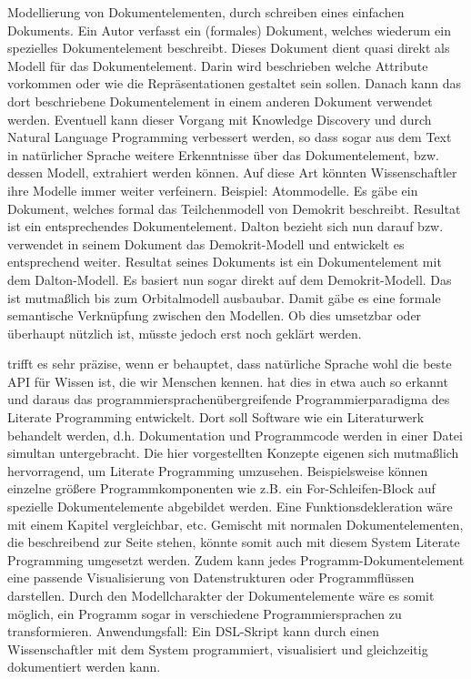  
Modellierung von Dokumentelementen, durch schreiben eines einfachen Dokuments. Ein Autor verfasst ein (formales) Dokument, welches wiederum ein spezielles Dokumentelement beschreibt. Dieses Dokument dient quasi direkt als Modell für das Dokumentelement. Darin wird beschrieben welche Attribute vorkommen oder wie die Repräsentationen gestaltet sein sollen. Danach kann das dort beschriebene Dokumentelement in einem anderen Dokument verwendet werden. Eventuell kann dieser Vorgang mit Knowledge Discovery und durch Natural Language Programming verbessert werden, so dass sogar aus dem Text in natürlicher Sprache weitere Erkenntnisse über das Dokumentelement, bzw. dessen Modell, extrahiert werden können. Auf diese Art könnten Wissenschaftler ihre Modelle immer weiter verfeinern. Beispiel: Atommodelle. Es gäbe ein Dokument, welches formal das Teilchenmodell von Demokrit beschreibt. Resultat ist ein entsprechendes Dokumentelement. Dalton bezieht sich nun darauf bzw. verwendet in seinem Dokument das Demokrit-Modell und entwickelt es entsprechend weiter. Resultat seines Dokuments ist ein Dokumentelement mit dem Dalton-Modell. Es basiert nun sogar direkt auf dem Demokrit-Modell. Das ist mutmaßlich bis zum Orbitalmodell ausbaubar. Damit gäbe es eine formale semantische Verknüpfung zwischen den Modellen. Ob dies umsetzbar oder überhaupt nützlich ist, müsste jedoch erst noch geklärt werden.

 
\citep[S.~3]{Segaran} trifft es sehr präzise, wenn er behauptet, dass natürliche Sprache wohl die beste API für Wissen ist, die wir Menschen kennen. \citep[S.~1]{Knuth} hat dies in etwa auch so erkannt und daraus das programmiersprachenübergreifende Programmierparadigma des Literate Programming entwickelt. Dort soll Software wie ein Literaturwerk behandelt werden, d.h. Dokumentation und Programmcode werden in einer Datei simultan untergebracht. Die hier vorgestellten Konzepte eigenen sich mutmaßlich hervorragend, um Literate Programming umzusehen. Beispielsweise können einzelne größere Programmkomponenten wie z.B. ein For-Schleifen-Block auf spezielle Dokumentelemente abgebildet werden. Eine Funktionsdekleration wäre mit einem Kapitel vergleichbar, etc. Gemischt mit normalen Dokumentelementen, die beschreibend zur Seite stehen, könnte somit auch mit diesem System Literate Programming umgesetzt werden. Zudem kann jedes Programm-Dokumentelement eine passende Visualisierung von Datenstrukturen oder Programmflüssen darstellen. Durch den Modellcharakter der Dokumentelemente wäre es somit möglich, ein Programm sogar in verschiedene Programmiersprachen zu transformieren. Anwendungsfall: Ein DSL-Skript kann durch einen Wissenschaftler mit dem System programmiert, visualisiert und gleichzeitig dokumentiert werden kann.
